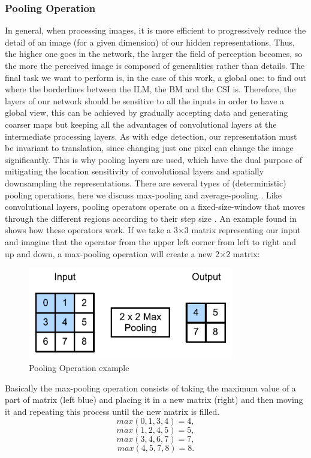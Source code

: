 \documentclass[12pt,a4paper]{scrartcl}
\begin{document}
\subsubsection{Pooling Operation}
In general, when processing images, it is more efficient to progressively reduce the detail of an image (for a given dimension) of our hidden representations. Thus, the higher one goes in the network, the larger the field of perception becomes, so the more the perceived image is composed of generalities rather than details. The final task we want to perform is, in the case of this work, a global one: to find out where the borderlines between the ILM, the BM and the CSI is. Therefore, the layers of our network should be sensitive to all the inputs in order to have a global view, this can be achieved by gradually accepting data and generating coarser maps but keeping all the advantages of convolutional layers at the intermediate processing layers. As with edge detection,  our representation must be invariant to translation, since changing just one pixel can change the image significantly. This is why pooling layers are used, which have the dual purpose of mitigating the location sensitivity of convolutional layers and spatially downsampling the representations. There are several types of (deterministic) pooling operations, here we discuss max-pooling and average-pooling \cite{DFTPooling}. Like convolutional layers, pooling operators operate on a fixed-size-window that moves through the different regions according to their step size \cite{DIDLBook}.
An example found in \cite{DIDLBook} shows how these operators work. If we take a 3$\times$3 matrix representing our input and imagine that the operator from the upper left corner from left to right and up and down, a max-pooling operation will create a new 2$\times$2 matrix: 

\begin{figure}[H]
    \centering
    \includegraphics[width=0.8\textwidth]{./images/pooling_example.png}
    \caption{Pooling Operation example  \cite{DIDLBook}}
\end{figure}
Basically the max-pooling operation consists of taking the maximum value of a part of matrix (left blue) and placing it in a new matrix (right) and then moving it and repeating this process until the new matrix is filled.
\[max(0, 1, 3, 4) = 4,\]
\[max(1, 2, 4, 5) = 5,\]
\[max(3, 4, 6, 7) = 7,\]
\[max(4, 5, 7, 8) = 8.\]
\end{document}
